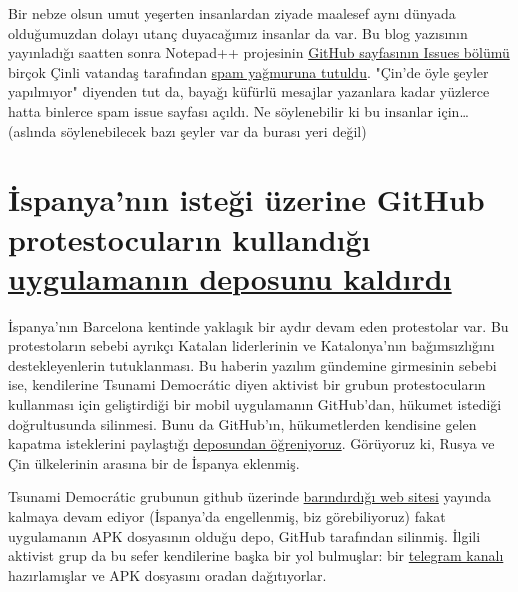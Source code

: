 \documentclass[11pt]{article}
\begin{document}
Bir nebze olsun umut yeşerten insanlardan ziyade maalesef aynı dünyada
olduğumuzdan dolayı utanç duyacağımız insanlar da var. Bu blog yazısının
yayınladığı saatten sonra Notepad++ projesinin \href{https://github.com/notepad-plus-plus/notepad-plus-plus/issues}{GitHub sayfasının Issues bölümü}
birçok Çinli vatandaş tarafından \href{https://www.zdnet.com/article/chinese-users-attack-notepad-app-after-free-uyghur-release/}{spam yağmuruna tutuldu}. "Çin'de öyle şeyler
yapılmıyor" diyenden tut da, bayağı küfürlü mesajlar yazanlara kadar yüzlerce
hatta binlerce spam issue sayfası açıldı. Ne söylenebilir ki bu insanlar
için\ldots{} (aslında söylenebilecek bazı şeyler var da burası yeri değil)
\section{İspanya'nın isteği üzerine GitHub protestocuların kullandığı \href{https://www.vice.com/en\_ca/article/9kevn7/spain-and-github-are-blocking-an-app-that-helped-protesters-organize}{uygulamanın deposunu kaldırdı}}
\label{sec:org622d0b0}
İspanya'nın Barcelona kentinde yaklaşık bir aydır devam eden protestolar var.
Bu protestoların sebebi ayrıkçı Katalan liderlerinin ve Katalonya'nın
bağımsızlığını destekleyenlerin tutuklanması. Bu haberin yazılım gündemine
girmesinin sebebi ise, kendilerine Tsunami Democrátic diyen aktivist bir grubun
protestocuların kullanması için geliştirdiği bir mobil uygulamanın GitHub'dan,
hükumet istediği doğrultusunda silinmesi. Bunu da GitHub'ın, hükumetlerden
kendisine gelen kapatma isteklerini paylaştığı \href{https://github.com/github/gov-takedowns}{deposundan öğreniyoruz}.
Görüyoruz ki, Rusya ve Çin ülkelerinin arasına bir de İspanya eklenmiş.

Tsunami Democrátic grubunun github üzerinde \href{https://tsunamidemocratic.github.io/}{barındırdığı web sitesi} yayında
kalmaya devam ediyor (İspanya'da engellenmiş, biz görebiliyoruz) fakat
uygulamanın APK dosyasının olduğu depo, GitHub tarafından silinmiş. İlgili
aktivist grup da bu sefer kendilerine başka bir yol bulmuşlar: bir \href{https://t.me/apptsunamidemocratic}{telegram
kanalı} hazırlamışlar ve APK dosyasını oradan dağıtıyorlar.
\end{document}
